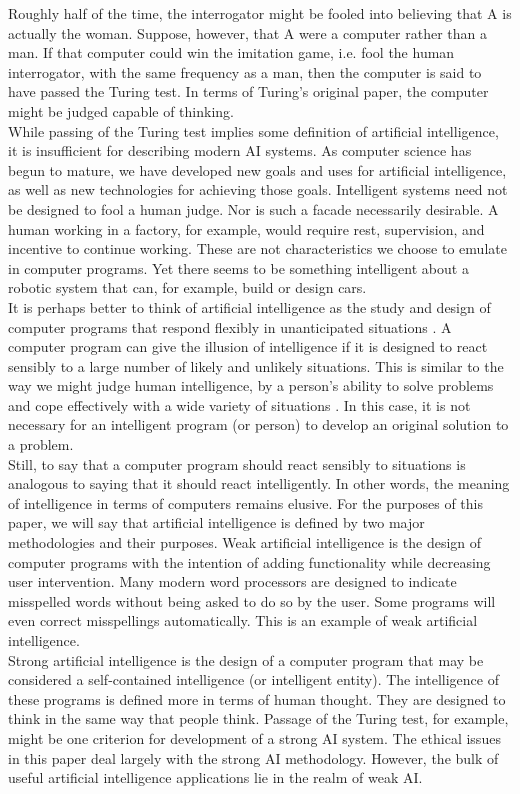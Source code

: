 Roughly half of the time, the interrogator might be fooled into believing that A is
actually the woman. Suppose, however, that A were a computer rather than a man. If
that computer could win the imitation game, i.e. fool the human interrogator, with the same frequency as a man, then the computer is said to have passed the Turing test. In
terms of Turing’s original paper, the computer might be judged capable of thinking.\\
While passing of the Turing test implies some definition of artificial intelligence,
it is insufficient for describing modern AI systems. As computer science has begun to
mature, we have developed new goals and uses for artificial intelligence, as well as new
technologies for achieving those goals. Intelligent systems need not be designed to fool a
human judge. Nor is such a facade necessarily desirable. A human working in a factory,
for example, would require rest, supervision, and incentive to continue working. These
are not characteristics we choose to emulate in computer programs. Yet there seems to
be something intelligent about a robotic system that can, for example, build or design
cars.\\
It is perhaps better to think of artificial intelligence as the study and design of
computer programs that respond flexibly in unanticipated situations \cite{one}. A
computer program can give the illusion of intelligence if it is designed to react sensibly to
a large number of likely and unlikely situations. This is similar to the way we might
judge human intelligence, by a person’s ability to solve problems and cope effectively
with a wide variety of situations \cite{three}. In this case, it is not necessary for an intelligent
program (or person) to develop an original solution to a problem.\\
Still, to say that a computer program should react sensibly to situations is
analogous to saying that it should react intelligently. In other words, the meaning of
intelligence in terms of computers remains elusive. For the purposes of this paper, we
will say that artificial intelligence is defined by two major methodologies and their
purposes. Weak artificial intelligence is the design of computer programs with the intention of adding functionality while decreasing user intervention. Many modern word
processors are designed to indicate misspelled words without being asked to do so by the
user. Some programs will even correct misspellings automatically. This is an example of
weak artificial intelligence.\\
Strong artificial intelligence is the design of a computer program that may be
considered a self-contained intelligence (or intelligent entity). The intelligence of these
programs is defined more in terms of human thought. They are designed to think in the
same way that people think. Passage of the Turing test, for example, might be one
criterion for development of a strong AI system. The ethical issues in this paper deal
largely with the strong AI methodology. However, the bulk of useful artificial
intelligence applications lie in the realm of weak AI.
    
